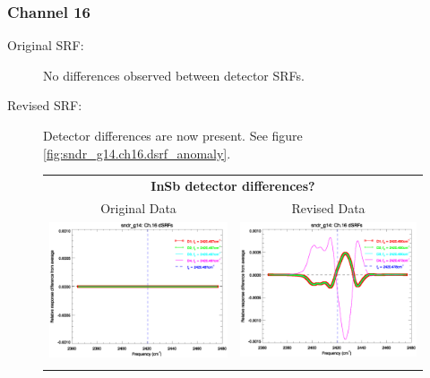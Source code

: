 \subsubsection{Channel 16}
\begin{description}
  \item[Original SRF:] No differences observed between detector SRFs.
  \item[Revised SRF:]  Detector differences are now present. See figure \ref{fig:sndr_g14.ch16.dsrf_anomaly}.
\end{description}

\begin{figure}[htp]
  \centering
  \begin{tabular}{c c}
    \multicolumn{2}{c}{\textsf{\bfseries InSb detector differences?}} \\
    \hspace{1.5em}\textsf{Original Data} &
    \hspace{1.5em}\textsf{Revised Data} \\
    \includegraphics[scale=0.5,trim=0 40 0 0]{graphics/dsrf_anomaly/original/sndr_g14.ch16.srf.eps} &
    \includegraphics[scale=0.5,trim=0 40 0 0]{graphics/dsrf_anomaly/revised/sndr_g14.ch16.srf.eps} \\\\

\end{tabular}
\end{figure}
